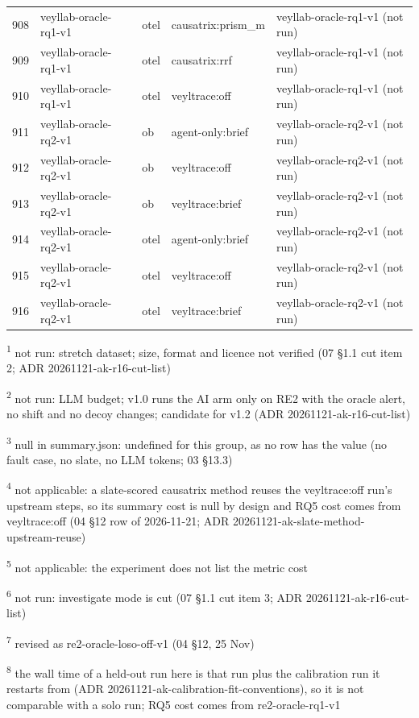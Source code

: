 \begin{longtable}{@{}r>{\raggedright\arraybackslash}p{87.0pt}>{\raggedright\arraybackslash}p{18.0pt}>{\raggedright\arraybackslash}p{63.0pt}>{\raggedright\arraybackslash}p{108.0pt}@{}}
908 & veyllab-oracle-rq1-v1 & otel & causatrix:prism\_m & veyllab-oracle-rq1-v1 (not run) \\
909 & veyllab-oracle-rq1-v1 & otel & causatrix:rrf & veyllab-oracle-rq1-v1 (not run) \\
910 & veyllab-oracle-rq1-v1 & otel & veyltrace:off & veyllab-oracle-rq1-v1 (not run) \\
911 & veyllab-oracle-rq2-v1 & ob & agent-only:brief & veyllab-oracle-rq2-v1 (not run) \\
912 & veyllab-oracle-rq2-v1 & ob & veyltrace:off & veyllab-oracle-rq2-v1 (not run) \\
913 & veyllab-oracle-rq2-v1 & ob & veyltrace:brief & veyllab-oracle-rq2-v1 (not run) \\
914 & veyllab-oracle-rq2-v1 & otel & agent-only:brief & veyllab-oracle-rq2-v1 (not run) \\
915 & veyllab-oracle-rq2-v1 & otel & veyltrace:off & veyllab-oracle-rq2-v1 (not run) \\
916 & veyllab-oracle-rq2-v1 & otel & veyltrace:brief & veyllab-oracle-rq2-v1 (not run) \\
\end{longtable}
\par\raggedright\noindent
\textsuperscript{1} not run: stretch dataset; size, format and licence not verified (07 \S{}1.1 cut item 2; ADR 20261121-ak-r16-cut-list)\par
\textsuperscript{2} not run: LLM budget; v1.0 runs the AI arm only on RE2 with the oracle alert, no shift and no decoy changes; candidate for v1.2 (ADR 20261121-ak-r16-cut-list)\par
\textsuperscript{3} null in summary.json: undefined for this group, as no row has the value (no fault case, no slate, no LLM tokens; 03 \S{}13.3)\par
\textsuperscript{4} not applicable: a slate-scored causatrix method reuses the veyltrace:off run's upstream steps, so its summary cost is null by design and RQ5 cost comes from veyltrace:off (04 \S{}12 row of 2026-11-21; ADR 20261121-ak-slate-method-upstream-reuse)\par
\textsuperscript{5} not applicable: the experiment does not list the metric cost\par
\textsuperscript{6} not run: investigate mode is cut (07 \S{}1.1 cut item 3; ADR 20261121-ak-r16-cut-list)\par
\textsuperscript{7} revised as re2-oracle-loso-off-v1 (04 \S{}12, 25 Nov)\par
\textsuperscript{8} the wall time of a held-out run here is that run plus the calibration run it restarts from (ADR 20261121-ak-calibration-fit-conventions), so it is not comparable with a solo run; RQ5 cost comes from re2-oracle-rq1-v1\par
